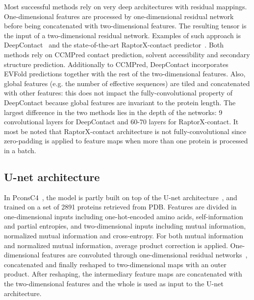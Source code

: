         Most successful methods rely on very deep architectures with residual mappings.
        One-dimensional features are processed by one-dimensional residual network
        before being concatenated with two-dimensional features. The resulting tensor
        is the input of a two-dimensional residual network.
        Examples of such approach is DeepContact~\cite{DeepContact} and the state-of-the-art
        RaptorX-contact predictor~\cite{DeepContact}. Both methods rely on CCMPred contact
        prediction, solvent accessibility and secondary structure prediction.
        Additionally to CCMPred, DeepContact incorporates EVFold predictions together
        with the rest of the two-dimensional features. Also, global features (e.g. the number
        of effective sequences) are tiled and concatenated with other features: this does
        not impact the fully-convolutional property of DeepContact because global features
        are invariant to the protein length. 
        The largest difference in the two methods lies in the depth of the networks:
        9 convolutional layers for DeepContact and 60-70 layers for RaptorX-contact.
        It most be noted that RaptorX-contact architecture is not fully-convolutional
        since zero-padding is applied to feature maps when more than one protein
        is processed in a batch.

    \subsection{U-net architecture}

        In PconsC4~\cite{Michel383133}, the model is partly built on top of the U-net
        architecture~\cite{DBLP:journals/corr/RonnebergerFB15}, and trained on a set
        of 2891 proteins retrieved from PDB. Features are divided in one-dimensional
        inputs including one-hot-encoded amino acids, self-information and
        partial entropies, and two-dimensional inputs including mutual information,
        normalized mutual information and cross-entropy.
        For both mutual information and normalized mutual information,
        average product correction is applied.
        One-dimensional features are convoluted through one-dimensional residual networks~,
        concatenated and finally reshaped to two-dimensional maps with an outer product.
        After reshaping, the intermediary feature maps are concatenated with the
        two-dimensional features and the whole is used as input to the U-net architecture.

